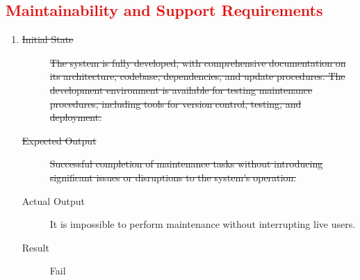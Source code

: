 \documentclass[12pt, titlepage]{article}
\newcommand{\rt}[1]{\textcolor{red}{#1}}
\begin{document}
\rt{\subsection{Maintainability and Support Requirements}}
\begin{enumerate}
\item \label{NFRT19}
  \begin{description}
  \item[\sout{Initial State}] \sout{The system is fully developed, with
      comprehensive documentation on its architecture, codebase,
      dependencies, and update procedures. The development environment is
      available for testing maintenance procedures, including tools for
      version control, testing, and deployment.}
  \item[\sout{Expected Output}] \sout{Successful completion of maintenance
      tasks without introducing significant issues or disruptions to the
      system's operation.}
  \item[Actual Output] It is impossible to perform maintenance without
    interrupting live users.
  \item[Result] Fail
  \end{description}
  \addtocounter{enumi}{2}
\end{enumerate}
\end{document}
